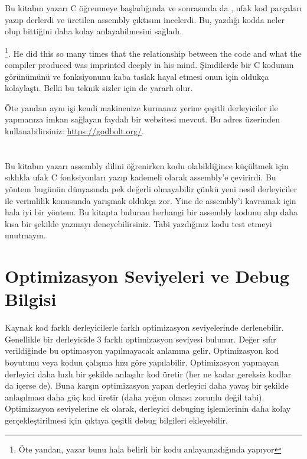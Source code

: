 
Bu kitabın yazarı C öğrenmeye başladığında ve sonrasında da \Cpp, ufak kod parçaları yazıp derlerdi ve üretilen assembly çıktısını incelerdi. Bu, yazdığı kodda neler olup bittiğini daha kolay anlayabilmesini sağladı.

\footnote{Öte yandan, yazar bunu hala belirli bir kodu anlayamadığında yapıyor}.
He did this so many times that the relationship between the \CCpp code and what the compiler produced was imprinted deeply in his mind.
Şimdilerde bir C kodunun görünümünü ve fonksiyonunu kaba taslak hayal etmesi onun için oldukça kolaylaştı.
Belki bu teknik sizler için de yararlı olur.


Öte yandan aynı işi kendi makinenize kurmanız yerine çeşitli derleyiciler ile yapmanıza imkan sağlayan faydalı bir websitesi mevcut. 
Bu adres üzerinden kullanabilirsiniz: \url{https://godbolt.org/}.

\section*{\Exercises}

Bu kitabın yazarı assembly dilini öğrenirken kodu olabildiğince küçültmek için sıklıkla ufak C fonksiyonları yazıp kademeli olarak assembly'e çevirirdi.
Bu yöntem bugünün dünyasında pek değerli olmayabilir çünkü yeni nesil derleyiciler  ile verimlilik konusunda yarışmak oldukça zor. Yine de assembly'i kavramak için hala iyi bir yöntem. Bu kitapta bulunan herhangi bir assembly kodunu alıp daha kısa bir şekilde yazmayı deneyebilirsiniz.
Tabi yazdığınız kodu test etmeyi unutmayın.

\section*{Optimizasyon Seviyeleri ve Debug Bilgisi}

Kaynak kod farklı derleyicilerle farklı optimizasyon seviyelerinde derlenebilir.
Genellikle bir derleyicide 3 farklı optimizasyon seviyesi bulunur. Değer sıfır verildiğinde bu optimasyon yapılmayacak anlamına gelir.
Optimizasyon kod boyutunu veya kodun çalışma hızı göre yapılabilir.
Optimizasyon yapmayan derleyici daha hızlı bir şekilde anlaşılır kod üretir (her ne kadar gereksiz kodlar da içerse de). Buna karşın optimizasyon yapan derleyici daha yavaş bir şekilde anlaşılması daha güç kod üretir (daha yoğun olması zorunlu değil tabi).
Optimizasyon seviyelerine ek olarak, derleyici debuging işlemlerinin daha kolay gerçekleştirilmesi için çıktıya çeşitli debug bilgileri ekleyebilir.

